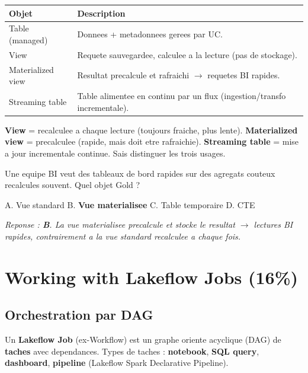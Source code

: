 \documentclass[11pt,a4paper]{article}
\begin{document}
\begin{center}
\renewcommand{\arraystretch}{1.3}
\begin{tabular}{@{}p{4cm}p{10.5cm}@{}}
\toprule
\textbf{Objet} & \textbf{Description} \\
\midrule
Table (managed) & Donnees + metadonnees gerees par UC. \\
View & Requete sauvegardee, calculee a la lecture (pas de stockage). \\
Materialized view & Resultat precalcule et rafraichi $\rightarrow$ requetes BI rapides. \\
Streaming table & Table alimentee en continu par un flux (ingestion/transfo incrementale). \\
\bottomrule
\end{tabular}
\end{center}

\begin{piege}
\textbf{View} = recalculee a chaque lecture (toujours fraiche, plus lente).
\textbf{Materialized view} = precalculee (rapide, mais doit etre rafraichie).
\textbf{Streaming table} = mise a jour incrementale continue. Sais distinguer les trois usages.
\end{piege}

\begin{qcm}
Une equipe BI veut des tableaux de bord rapides sur des agregats couteux recalcules souvent.
Quel objet Gold ?

\smallskip
A. Vue standard \hfill
B. \textbf{Vue materialisee} \hfill
C. Table temporaire \hfill
D. CTE

\smallskip
\textit{Reponse : \textbf{B}. La vue materialisee precalcule et stocke le resultat $\rightarrow$
lectures BI rapides, contrairement a la vue standard recalculee a chaque fois.}
\end{qcm}

\section{Working with Lakeflow Jobs (16\%)}

\subsection{Orchestration par DAG}

Un \textbf{Lakeflow Job} (ex-Workflow) est un graphe oriente acyclique (DAG) de \textbf{taches}
avec dependances. Types de taches : \textbf{notebook}, \textbf{SQL query}, \textbf{dashboard},
\textbf{pipeline} (Lakeflow Spark Declarative Pipeline).
\end{document}

